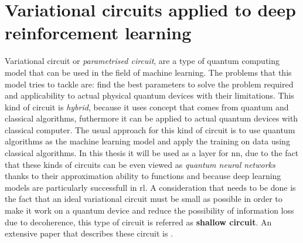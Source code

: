 \section{Variational circuits applied to deep reinforcement learning}
Variational circuit or \textit{parametrised circuit}, are a type of quantum computing model that can be used in the field of machine learning. The problems that this model tries to tackle are: find the best parameters to solve the problem required and applicability to actual physical quantum devices with their limitations. This kind of circuit is \textit{hybrid}, because it uses concept that comes from quantum and classical algorithms, futhermore it can be applied to actual quantum devices with classical computer. The usual approach for this kind of circuit is to use quantum algorithms as the machine learning model and apply the training on data using classical algorithms. In this thesis it will be used as a layer for \acrfull{nn}, due to the fact that these kinds of circuits can be even viewed as \textit{quantum neural networks} thanks to their approximation ability to functions and because deep learning models are particularly successfull in \acrfull{rl}. A consideration that needs to be done is the fact that an ideal variational circuit must be small as possible in order to make it work on a quantum device and reduce the possibility of information loss due to decoherence, this type of circuit is referred as \textbf{shallow circuit}. An extensive paper that describes these circuit is \cite{Cerezo_2021}.
